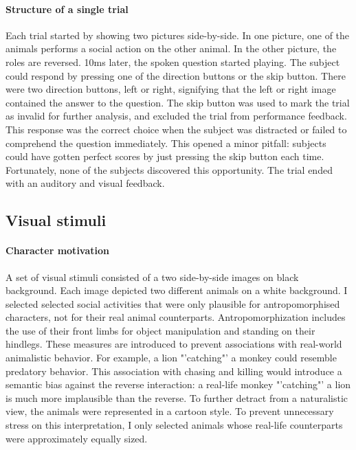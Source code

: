 \paragraph{Structure of a single trial}
Each trial started by showing two pictures side-by-side.
In one picture, one of the animals performs a social action on the other animal.
In the other picture, the roles are reversed.
10ms later, the spoken question started playing.
The subject could respond by pressing one of the direction buttons or the skip button.
There were two direction buttons, left or right, signifying that the left or right image contained the answer to the question.
The skip button was used to mark the trial as invalid for further analysis, and excluded the trial from performance feedback.
This response was the correct choice when the subject was distracted or failed to comprehend the question immediately.
This opened a minor pitfall: subjects could have gotten perfect scores by just pressing the skip button each time.
Fortunately, none of the subjects discovered this opportunity.
The trial ended with an auditory and visual feedback.


\subsection{Visual stimuli}

\paragraph{Character motivation}
A set of visual stimuli consisted of a two side-by-side images on black background.
Each image depicted two different animals on a white background.
I selected selected social activities that were only plausible for antropomorphised characters, not for their real animal counterparts.
Antropomorphization includes the use of their front limbs for object manipulation and standing on their hindlegs.
These measures are introduced to prevent associations with real-world animalistic behavior.
For example, a lion "'catching"' a monkey could resemble predatory behavior.
This association with chasing and killing would introduce a semantic bias against the reverse interaction: a real-life monkey "'catching"' a lion is much more implausible than the reverse.
To further detract from a naturalistic view, the animals were represented in a cartoon style.
To prevent unnecessary stress on this interpretation, I only selected animals whose real-life counterparts were approximately equally sized.


